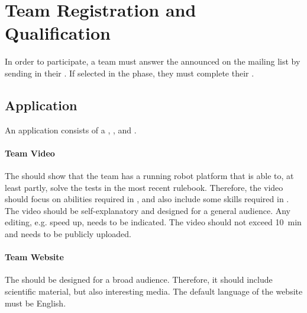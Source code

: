 \section{Team Registration and Qualification}
\label{sec:rules:particpation}

In order to participate, a team must answer the \CFP{} announced on the \AtHome{} mailing list by sending in their \Application{}. If selected in the \Qualification{} phase, they must complete their \Registration{}.

\subsection{Application}
\label{sec:rules:application}

An application consists of a \TeamVideo{}, \TeamWebsite{}, and \TDP{}.

\paragraph{Team Video}
\label{sec:rules:application:video}
The \TeamVideo{} should show that the team has a running robot platform that is able to, at least partly, solve the tests in the most recent rulebook. Therefore, the video should focus on abilities required in \SONE{}, and also include some skills required in \STWO{}. The video should be self-explanatory and designed for a general audience. Any editing, e.g. speed up, needs to be indicated. The video should not exceed \SI{10}{\minute} and needs to be publicly uploaded.


\paragraph{Team Website}
\label{sec:rules:application:website}
The \TeamWebsite{} should be designed for a broad audience. Therefore, it should include scientific material, but also interesting media. The default language of the website must be English.


